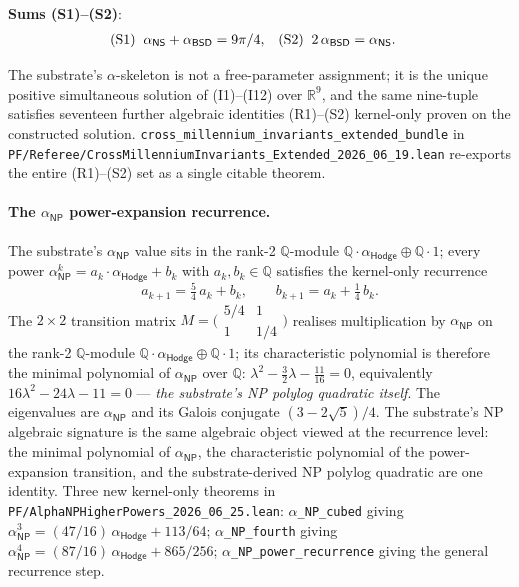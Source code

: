 \documentclass[11pt,a4paper]{amsart}
\theoremstyle{plain}
\theoremstyle{definition}
\begin{document}
\noindent\textbf{Sums \textup{(S1)--(S2)}}:
\begin{align*}
\textup{(S1)}\;\; \alpha_{\textsf{NS}} + \alpha_{\textsf{BSD}}  &= 9\pi/4,&
\textup{(S2)}\;\; 2\,\alpha_{\textsf{BSD}}     &= \alpha_{\textsf{NS}}.
\end{align*}

The substrate's $\alpha$-skeleton is not a free-parameter assignment; it is the unique positive simultaneous solution of (I1)--(I12) over $\mathbb{R}^9$, and the same nine-tuple satisfies seventeen further algebraic identities (R1)--(S2) kernel-only proven on the constructed solution. \texttt{cross\_millennium\_invariants\_extended\_bundle} in \texttt{PF/Referee/CrossMillenniumInvariants\_Extended\_2026\_06\_19.lean} re-exports the entire (R1)--(S2) set as a single citable theorem.

\paragraph{The $\alpha_{\textsf{NP}}$ power-expansion recurrence.} The substrate's $\alpha_{\textsf{NP}}$ value sits in the rank-2 $\mathbb{Q}$-module $\mathbb{Q}\cdot\alpha_{\textsf{Hodge}}\oplus\mathbb{Q}\cdot 1$; every power $\alpha_{\textsf{NP}}^{k} = a_k\cdot\alpha_{\textsf{Hodge}} + b_k$ with $a_k, b_k \in \mathbb{Q}$ satisfies the kernel-only recurrence
\[
a_{k+1} = \tfrac{5}{4}\,a_k + b_k,\qquad b_{k+1} = a_k + \tfrac{1}{4}\,b_k.
\]
The $2\times 2$ transition matrix $M = \bigl(\begin{smallmatrix}5/4 & 1\\ 1 & 1/4\end{smallmatrix}\bigr)$ realises multiplication by $\alpha_{\textsf{NP}}$ on the rank-2 $\mathbb{Q}$-module $\mathbb{Q}\cdot\alpha_{\textsf{Hodge}}\oplus\mathbb{Q}\cdot 1$; its characteristic polynomial is therefore the minimal polynomial of $\alpha_{\textsf{NP}}$ over $\mathbb{Q}$: $\lambda^2 - \tfrac{3}{2}\lambda - \tfrac{11}{16} = 0$, equivalently $16\lambda^2 - 24\lambda - 11 = 0$ --- \emph{the substrate's NP polylog quadratic itself}. The eigenvalues are $\alpha_{\textsf{NP}}$ and its Galois conjugate $(3 - 2\sqrt{5})/4$. The substrate's NP algebraic signature is the same algebraic object viewed at the recurrence level: the minimal polynomial of $\alpha_{\textsf{NP}}$, the characteristic polynomial of the power-expansion transition, and the substrate-derived NP polylog quadratic are one identity. Three new kernel-only theorems in \texttt{PF/AlphaNPHigherPowers\_2026\_06\_25.lean}: \texttt{$\alpha$\_NP\_cubed} giving $\alpha_{\textsf{NP}}^{3} = (47/16)\,\alpha_{\textsf{Hodge}} + 113/64$; \texttt{$\alpha$\_NP\_fourth} giving $\alpha_{\textsf{NP}}^{4} = (87/16)\,\alpha_{\textsf{Hodge}} + 865/256$; \texttt{$\alpha$\_NP\_power\_recurrence} giving the general recurrence step.
\end{document}
